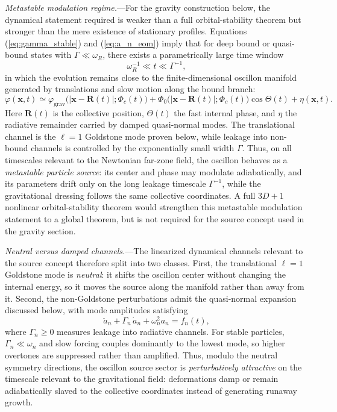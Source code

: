 \documentclass[aps,prd,onecolumn,superscriptaddress,nofootinbib,showpacs,12pt,notitlepage]{revtex4-2}
\begin{document}
\textit{Metastable modulation regime.}---For the gravity
construction below, the dynamical statement required is weaker
than a full orbital-stability theorem but stronger than the
mere existence of stationary profiles.  Equations
(\ref{eq:gamma_stable}) and (\ref{eq:a_n_eom}) imply that for
deep bound or quasi-bound states with $\Gamma \ll \omega_R$,
there exists a parametrically large time window
\begin{equation}
  \omega_R^{-1} \ll t \ll \Gamma^{-1},
\end{equation}
in which the evolution remains close to the finite-dimensional
oscillon manifold generated by translations and slow motion
along the bound branch:
\begin{equation}
  \varphi(\mathbf{x},t)
  \simeq \varphi_{\mathrm{grav}}
    \bigl(|\mathbf{x}-\mathbf{R}(t)|;\Phi_c(t)\bigr)
  + \Phi_0\bigl(|\mathbf{x}-\mathbf{R}(t)|;\Phi_c(t)\bigr)
    \cos\Theta(t)
  + \eta(\mathbf{x},t).
\end{equation}
Here $\mathbf{R}(t)$ is the collective position, $\Theta(t)$ the
fast internal phase, and $\eta$ the radiative remainder carried
by damped quasi-normal modes.  The translational channel is the
$\ell = 1$ Goldstone mode proven below, while leakage into
non-bound channels is controlled by the exponentially small
width $\Gamma$.  Thus, on all timescales relevant to the
Newtonian far-zone field, the oscillon behaves as a
\emph{metastable particle source}: its center and phase may
modulate adiabatically, and its parameters drift only on the
long leakage timescale $\Gamma^{-1}$, while the gravitational
dressing follows the same collective coordinates.  A full
$3D+1$ nonlinear orbital-stability theorem would strengthen this
metastable modulation statement to a global theorem, but is not
required for the source concept used in the gravity section.

\textit{Neutral versus damped channels.}---The linearized
dynamical channels relevant to the source concept therefore
split into two classes.  First, the translational $\ell = 1$
Goldstone mode is \emph{neutral}: it shifts the oscillon center
without changing the internal energy, so it moves the source
along the manifold rather than away from it.  Second, the
non-Goldstone perturbations admit the quasi-normal expansion
discussed below, with mode amplitudes satisfying
\begin{equation}
  \ddot{a}_n + \Gamma_n\,\dot{a}_n + \omega_n^2 a_n = f_n(t),
\end{equation}
where $\Gamma_n \ge 0$ measures leakage into radiative channels.
For stable particles, $\Gamma_n \ll \omega_n$ and slow forcing
couples dominantly to the lowest mode, so higher overtones are
suppressed rather than amplified.  Thus, modulo the neutral
symmetry directions, the oscillon source sector is
\emph{perturbatively attractive} on the timescale relevant to the
gravitational field: deformations damp or remain adiabatically
slaved to the collective coordinates instead of generating
runaway growth.
\end{document}
